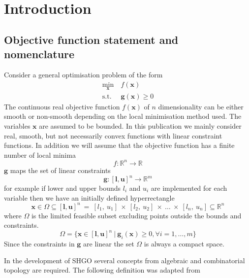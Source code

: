 \chapter{Introduction}
\section{Objective function statement and nomenclature}
Consider a general optimisation problem of the form
\begin{align} \nonumber
\underset{\mathbf{x}}{\textrm{min}} ~&f (\mathbf{x}) \\
\textrm{s.t.}~ &\mathbf{g} (\mathbf{x}) \geq 0
\end{align}
The continuous real objective function $f(\mathbf{x})$ of $n$ dimensionality can be either smooth or non-smooth depending on the local minimisation method used. The variables $\mathbf{x}$ are assumed to be bounded. In this publication we mainly consider real, smooth, but not necessarily convex functions with linear constraint functions. In addition we will assume that the objective function has a finite number of local minima
\begin{equation} \label{eq:objfun}
f : \mathbb{R}^n \rightarrow \mathbb{R}
\end{equation}
$\mathbf{g}$ maps the set of linear constraints
\begin{equation} \label{eq:gcons}
\mathbf{g} :  [\mathbf{l}, \mathbf{u}]^n  \rightarrow \mathbb{R}^m
\end{equation}
for example if lower and upper bounds $l_i$ and $u_i$ are implemented for each variable then we have an initially defined hyperrectangle 
\begin{equation}
\mathbf{x} \in \Omega \subseteq  [\mathbf{l}, \mathbf{u}]^n~=~[l_1,~u_1]~\times~[l_2,~u_2] ~\times~\dots~\times~[l_n,~u_n] \subseteq  \mathbb{R}^n
\end{equation}
 where $\Omega$ is the limited feasible subset excluding points outside the bounds and constraints. 
\begin{equation} \label{eq:omega}
\Omega = \{ \mathbf{x} \in   [\mathbf{l}, \mathbf{u}]^n ~|~ \mathbf{g}_i (\mathbf{x} ) \geq 0, \forall i =1, \dots, m\}
\end{equation}
Since the constraints in $\mathbf{g}$ are linear the set $\Omega$ is always a compact space.

In the development of SHGO several concepts from algebraic and combinatorial topology \cite{Henle1979} are required. The following definition was adapted from \citet[p. 9]{Hatcher2011} 

